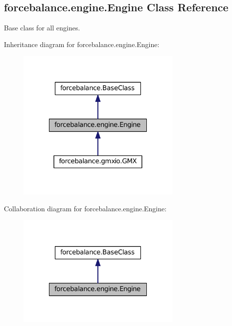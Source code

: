 \hypertarget{classforcebalance_1_1engine_1_1Engine}{\subsection{forcebalance.\-engine.\-Engine \-Class \-Reference}
\label{classforcebalance_1_1engine_1_1Engine}
}


\-Base class for all engines.  




\-Inheritance diagram for forcebalance.\-engine.\-Engine\-:
\nopagebreak
\begin{figure}[H]
\begin{center}
\leavevmode
\includegraphics[width=228pt]{classforcebalance_1_1engine_1_1Engine__inherit__graph}
\end{center}
\end{figure}


\-Collaboration diagram for forcebalance.\-engine.\-Engine\-:
\nopagebreak
\begin{figure}[H]
\begin{center}
\leavevmode
\includegraphics[width=228pt]{classforcebalance_1_1engine_1_1Engine__coll__graph}
\end{center}
\end{figure}
